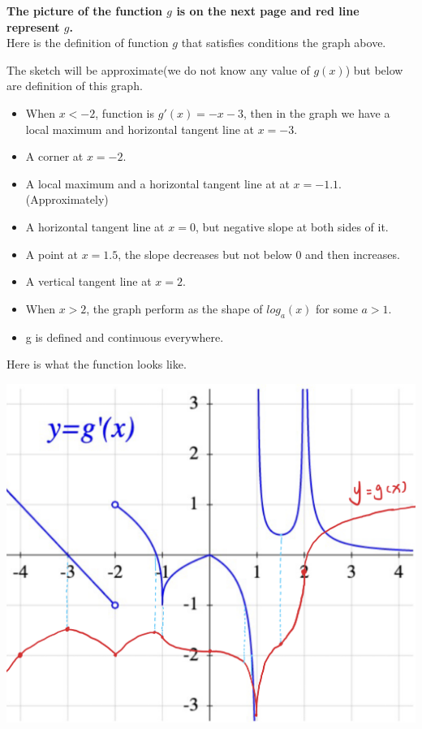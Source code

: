 \documentclass[12pt]{exam}
\newcommand{\vv}{\vspace{.4cm}}
\begin{document}
\textbf{The picture of the function $g$ is on the next page and red line represent $g$.}\\
Here is the definition of function $g$ that satisfies conditions the graph above.\\

\vv

The sketch will be approximate(we do not know any value of $g(x)$) but below are definition of this graph.

\begin{itemize}
	\item When $x<-2$, function is $g'(x)=-x-3$, then in the graph we have a local maximum and horizontal tangent line at $x=-3$.
	\item A corner at $x=-2$.
	\item A local maximum and a horizontal tangent line at at $x=-1.1$.(Approximately)
	\item A horizontal tangent line at $x=0$, but negative slope at both sides of it.
	\item A point at $x=1.5$, the slope decreases but not below 0 and then increases.
	\item A vertical tangent line at $x=2$.
	\item When $x>2$, the graph perform as the shape of $log_a(x)$ for some $a>1$.
	\item g is defined and continuous everywhere.
\end{itemize}


Here is what the function looks like.
\vv

\includegraphics[scale = 0.5]{function graph.png}
\end{document}
